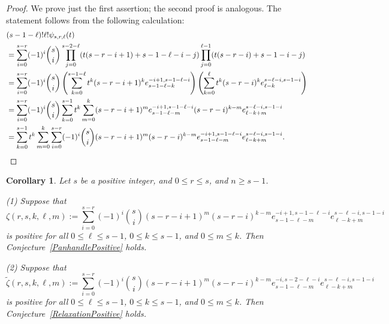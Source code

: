 \documentclass[11pt]{amsart}
\newtheorem{corollary}[theorem]{Corollary}
\theoremstyle{definition}
\newcommand{\0}{\emptyset}
\newcommand{\elm}[2]{e_{#1}^{#2}} %
\begin{document}
\begin{proof}
We prove just the first assertion; the second proof is analogous.  The statement follows from the following calculation: 
\begin{align*}
&(s-1-\ell)!\ell!\psi_{s,r,\ell}(t)\\
&=\sum_{i=0}^{s-r}(-1)^i\binom{s}{i}\prod_{j=0}^{s-2-\ell}(t(s-r-i+1)+s-1-\ell-i-j)\prod_{j=0}^{\ell-1}(t(s-r-i)+s-1-i-j)\\
&=\sum_{i=0}^{s-r}(-1)^i\binom{s}{i}\left(\sum_{k=0}^{s-1-\ell}t^k(s-r-i+1)^k \elm{s-1-\ell-k}{-i+1,s-1-\ell-i}\right)\left(\sum_{k=0}^\ell t^k(s-r-i)^k \elm{\ell-k}{s-\ell-i,s-1-i}\right)\label{Psi:1}\\
&=\sum_{i=0}^{s-r}(-1)^i\binom{s}{i}\sum_{k=0}^{s-1}t^k\sum_{m=0}^k(s-r-i+1)^m \elm{s-1-\ell-m}{-i+1,s-1-\ell-i}(s-r-i)^{k-m} \elm{\ell-k+m}{s-\ell-i,s-1-i}\\
&=\sum_{k=0}^{s-1}t^k\sum_{m=0}^k\sum_{i=0}^{s-r}(-1)^i\binom{s}{i}(s-r-i+1)^m(s-r-i)^{k-m} \elm{s-1-\ell-m}{-i+1,s-1-\ell-i} \elm{\ell-k+m}{s-\ell-i,s-1-i}. \qedhere
\end{align*}
\end{proof}

\begin{corollary}
Let $s$ be a positive integer, and $0\leq r\leq s$, and $n\geq s-1$.

(1) Suppose that
\[
\zeta(r,s,k,\ell,m):=\sum_{i=0}^{s-r}(-1)^i\binom{s}{i}(s-r-i+1)^m(s-r-i)^{k-m} \elm{s-1-\ell-m}{-i+1,s-1-\ell-i} \elm{\ell-k+m}{s-\ell-i,s-1-i}
\]
is positive for all $0\leq \ell\leq s-1$, $0\leq k\leq s-1$, and $0\leq m\leq k$.
Then Conjecture~\ref{PanhandlePositive} holds.

(2) Suppose that
\[
\tilde\zeta(r,s,k,\ell,m):=\sum_{i=0}^{s-r}(-1)^i\binom{s}{i}(s-r-i+1)^m(s-r-i)^{k-m} \elm{s-1-\ell-m}{-i,s-2-\ell-i} \elm{\ell-k+m}{s-\ell-i,s-1-i}
\]
is positive for all $0\leq \ell\leq s-1$, $0\leq k\leq s-1$, and $0\leq m\leq k$.
Then Conjecture~\ref{RelaxationPositive} holds.
\end{corollary}
\end{document}
